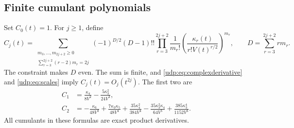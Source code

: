 \documentclass[11pt]{article}
\theoremstyle{remark}\newtheorem{remark}[theorem]{Remark}
\numberwithin{equation}{section}
\begin{document}
\subsection{Finite cumulant polynomials}
Set $C_0(t)=1$. For $j\ge1$, define
\begin{equation}\label{udp:eq:Cj}
 C_j(t)=\sum_{\substack{m_3,\ldots,m_{2j+2}\ge0\\
                   \sum_{r=3}^{2j+2}(r-2)m_r=2j}}
 (-1)^{D/2}(D-1)!!
 \prod_{r=3}^{2j+2}\frac1{m_r!}
 \left(\frac{\kappa_r(t)}{r!V(t)^{r/2}}\right)^{m_r},
 \qquad D=\sum_{r=3}^{2j+2}r m_r.
\end{equation}
The constraint makes $D$ even. The sum is finite, and \eqref{udp:eq:complexderivative} and \eqref{udp:eq:scales} imply $C_j(t)=O_j(t^{2j})$. The first two are
\begin{align}
 C_1&=\frac{\kappa_4}{8V^2}-\frac{5\kappa_3^2}{24V^3},\label{udp:eq:C1}\\
 C_2&=-\frac{\kappa_6}{48V^3}+\frac{7\kappa_3\kappa_5}{48V^4}
 +\frac{35\kappa_4^2}{384V^4}
 -\frac{35\kappa_3^2\kappa_4}{64V^5}
 +\frac{385\kappa_3^4}{1152V^6}.\label{udp:eq:C2}
\end{align}
All cumulants in these formulas are exact product derivatives.
\end{document}

